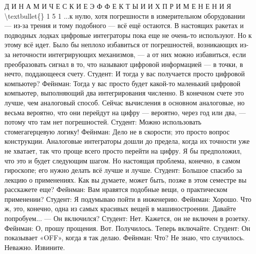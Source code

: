 \documentclass[10pt,oneside]{article}
\begin{document}
Д И Н А М И Ч Е С К И Е  Э Ф Ф Е К Т Ы  И  И Х  П Р И М Е Н Е Н И Я \textbackslash{}textbullet\{\} 1 5 1 ...к нулю, хотя погрешности в измерительном оборудовании --- из-за трения и тому подобного --- всё ещё остаются. В настоящих ракетах и подводных лодках цифровые интеграторы пока еще не очень-то используют. Но к этому всё идет. Было бы неплохо избавиться от погрешностей, возникающих из-за неточности интегрирующих механизмов, --- а от них можно избавиться, если преобразовать сигнал в то, что называют цифровой информацией --- в точки, в нечто, поддающееся счету. Студент: И тогда у вас получается просто цифровой компьютер? Фейнман: Тогда у вас просто будет какой-то маленький цифровой компьютер, выполняющий два интегрирования численно. В конечном счете это лучше, чем аналоговый способ. Сейчас вычисления в основном аналоговые, но весьма вероятно, что они перейдут на цифру --- вероятно, через год или два, --- потому что там нет погрешностей. Студент: Можно использовать стомегагерцевую логику! Фейнман: Дело не в скорости; это просто вопрос конструкции. Аналоговые интеграторы дошли до предела, когда их точности уже не хватает, так что проще всего просто перейти на цифру. Я бы предположил, что это и будет следующим шагом. Но настоящая проблема, конечно, в самом гироскопе; его нужно делать всё лучше и лучше. Студент: Большое спасибо за лекцию о применениях. Как вы думаете, может быть, позже в этом семестре вы расскажете еще? Фейнман: Вам нравятся подобные вещи, о практическом применении? Студент: Я подумываю пойти в инженерию. Фейнман: Хорошо. Что ж, это, конечно, одна из самых красивых вещей в машиностроении. Давайте попробуем... --- Он включился? Студент: Нет. Кажется, он не включен в розетку. Фейнман: О, прошу прощения. Вот. Получилось. Теперь включайте. Студент: Он показывает «OFF», когда я так делаю. Фейнман: Что? Не знаю, что случилось. Неважно. Извините.\par
\end{document}
